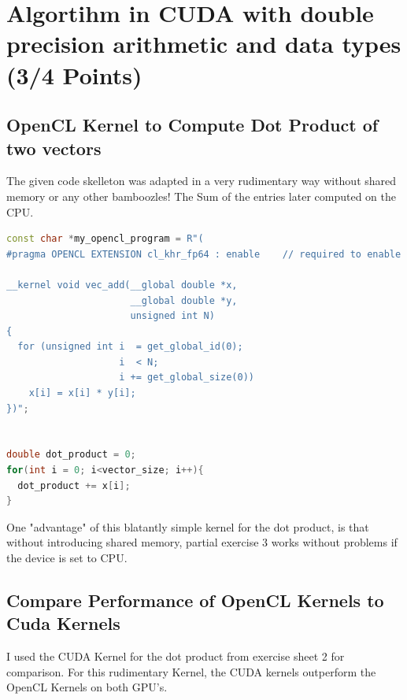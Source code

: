 
\section{Algortihm in CUDA with double precision arithmetic and data types (3/4 Points)}
\subsection{OpenCL Kernel to Compute Dot Product of two vectors}
The given code skelleton  was adapted in a very rudimentary way without shared memory or any other bamboozles! The Sum of the entries later computed on the CPU.

\begin{lstlisting}[language=C++, title=C++ Code Changes in \fun{vector\_add.cpp}]
const char *my_opencl_program = R"(
#pragma OPENCL EXTENSION cl_khr_fp64 : enable    // required to enable 'double' inside OpenCL programs

__kernel void vec_add(__global double *x,
                      __global double *y,
                      unsigned int N)
{
  for (unsigned int i  = get_global_id(0);
                    i  < N;
                    i += get_global_size(0))
    x[i] = x[i] * y[i];
})"; 


double dot_product = 0;
for(int i = 0; i<vector_size; i++){
  dot_product += x[i];
}
\end{lstlisting}

One "advantage" of this blatantly simple kernel for the dot product, is that without introducing shared memory, partial exercise 3 works without problems if the device is set to CPU.

\pagebreak

\subsection{Compare Performance of OpenCL Kernels to Cuda Kernels}
I used the CUDA Kernel for the dot product from exercise sheet 2 for comparison. For this rudimentary Kernel, the CUDA kernels outperform the OpenCL Kernels
on both GPU's.

